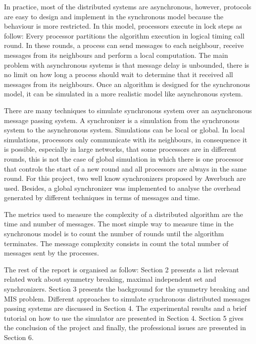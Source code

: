 In practice, most of the distributed systems are asynchronous, however, protocols are easy to design and implement in the synchronous model because the behaviour is more restricted. In this model, processors execute in lock steps as follow: Every processor partitions the algorithm execution in logical timing call round. In these rounds, a process can send messages to each neighbour, receive messages from its neighbours and perform a local computation. The main problem with asynchronous systems is that message delay is unbounded, there is no limit on how long a process should wait to determine that it received all messages from its neighbours. Once an algorithm is designed for the synchronous model, it can be simulated in a more realistic model like asynchronous system. 



There are many techniques to simulate synchronous system over an asynchronous message passing system. A synchronizer is a simulation from the synchronous system to the asynchronous system. Simulations can be local or global. In local simulations, processors only communicate with its neighbours, in consequence it is possible, especially in large networks, that some processors are in different rounds, this is not the case of global simulation in which there is one processor that controls the start of a new round and all processors are always in the same round. For this project, two well know synchronizers proposed by Awerbuch \cite{awerbuch1985complexity} are used. Besides, a global synchronizer was implemented to analyse the overhead generated by different techniques in terms of messages and time. 


The metrics used to measure the complexity of a distributed algorithm are the time and number of messages. The most simple way to measure time in the synchronous model is to count the number of rounds until the algorithm terminates. The message complexity consists in count the total number of messages sent by the processes. 

The rest of the report is organised as follow: Section 2 presents a list relevant related work about symmetry breaking, maximal independent set and synchronizers. Section 3 presents the background for the symmetry breaking and MIS problem. Different approaches to simulate synchronous distributed messages passing systems are discussed in Section 4. The experimental results and a brief tutorial on how to use the simulator are presented in Section 4. Section 5 gives the conclusion of the project and finally, the professional issues are presented in Section 6. 

